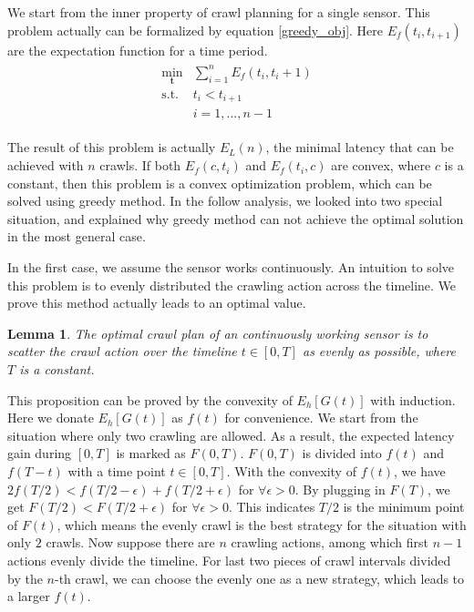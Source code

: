 \documentclass[conference]{IEEEtran}
\newtheorem{lemma}{Lemma}
\begin{document}
We start from the inner property of crawl planning for a single sensor. 
This problem actually can be formalized by equation \ref{greedy_obj}. 
Here $E_f(t_i,t_{i+1})$ are the expectation function for a time period.
\begin{eqnarray}
\begin{array}{ll}
\min_{\textbf{t}}& \sum_{i=1}^{n} E_f(t_i,t_i+1)\\
\text{s.t.}
& t_i < t_{i+1}\\
& i=1,\ldots,n-1
\end{array}\label{greedy_obj}
\end{eqnarray}

The result of this problem is actually $E_L(n)$, the minimal latency that can be achieved with $n$ crawls.
If both $E_f(c, t_i)$ and $E_f(t_i,c)$ are convex, where $c$ is a constant, then this problem is a convex optimization problem, which can be solved using greedy method.
In the follow analysis, we looked into two special situation, and explained why greedy method can not achieve the optimal solution in the most general case.

In the first case, we assume the sensor works continuously.
An intuition to solve this problem is to evenly distributed the crawling action across the timeline. 
We prove this method actually leads to an optimal value.
\begin{lemma}
\label{evenly}
The optimal crawl plan of an continuously working sensor is to scatter the crawl action over the timeline $t\in [0, T]$ as evenly as possible, where $T$ is a constant.
\end{lemma}
\begin{IEEEproof}
This proposition can be proved by the convexity of $E_h[G(t)]$ \cite{boyd2004convex} with induction. 
Here we donate $E_h[G(t)]$ as $f(t)$ for convenience.
We start from the situation where only two crawling are allowed. 
As a result, the expected latency gain during $[0,T]$ is marked as $F(0, T)$.
$F(0,T)$ is divided into $f(t)$ and $f(T-t)$ with a time point $t\in[0,T]$. 
With the convexity of $f(t)$, we have $2f(T/2)<f(T/2-\epsilon)+f(T/2+\epsilon)$ for $\forall{\epsilon>0}$. 
By plugging in $F(T)$, we get $F(T/2)<F(T/2+\epsilon)$ for $\forall{\epsilon>0}$.
This indicates $T/2$ is the minimum point of $F(t)$, which means the evenly crawl is the best strategy for the situation with only $2$ crawls.
Now suppose there are $n$ crawling actions, among which first $n-1$ actions evenly divide the timeline.
For last two pieces of crawl intervals divided by the $n$-th crawl, we can choose the evenly one as a new strategy, which leads to a larger $f(t)$.
\end{IEEEproof}
\end{document}
